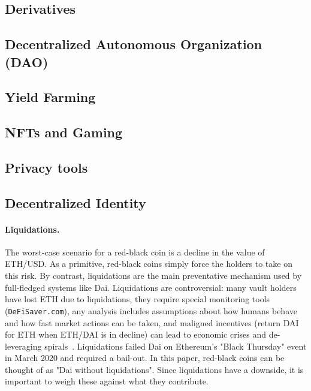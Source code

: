 \subsection{Derivatives}

\subsection{Decentralized Autonomous Organization (DAO)}

\subsection{Yield Farming}

\subsection{NFTs and Gaming}

\subsection{Privacy tools}

\subsection{Decentralized Identity}

\paragraph{Liquidations.} The worst-case scenario for a red-black coin is a decline in the value of ETH/USD. As a primitive, red-black coins simply force the holders to take on this risk. By contrast, liquidations are the main preventative mechanism used by full-fledged systems like Dai. Liquidations are controversial: many vault holders have lost ETH due to liquidations, they require special monitoring tools (\eg \texttt{DeFiSaver.com}), any analysis includes assumptions about how humans behave and how fast market actions can be taken, and maligned incentives (\eg return DAI for ETH when ETH/DAI is in decline) can lead to economic crises and de-leveraging spirals~\cite{GPH+20,KMM20}. Liquidations failed Dai on Ethereum's "Black Thursday" event in March 2020 and required a bail-out. In this paper, red-black coins can be thought of as "Dai without liquidations". Since liquidations have a downside, it is important to weigh these against what they contribute.
